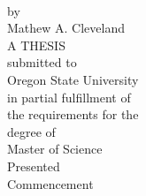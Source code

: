 
\thispagestyle{empty}

\setlength{\baselineskip}{21pt}

\begin{center}
{
   \myTitleName
\\ \vspace{0.25in}
   by
\\ \vspace{0.25in}
   Mathew A. Cleveland
\\ \vspace{1.0in}
   A THESIS
\\ \vspace{0.25in}
   submitted to
\\ \vspace{0.25in}
   Oregon State University
\\ \vspace{1.0in}
   in partial fulfillment of
\\
   the requirements for the
\\
   degree of
\\ \vspace{0.25in}
   Master of Science
\\ \vspace{1.0in}
   Presented \myDefenseDate
\\ 
   Commencement \myCommenceDate
}
\end{center}

\addtolength{\baselineskip}{-7pt}


